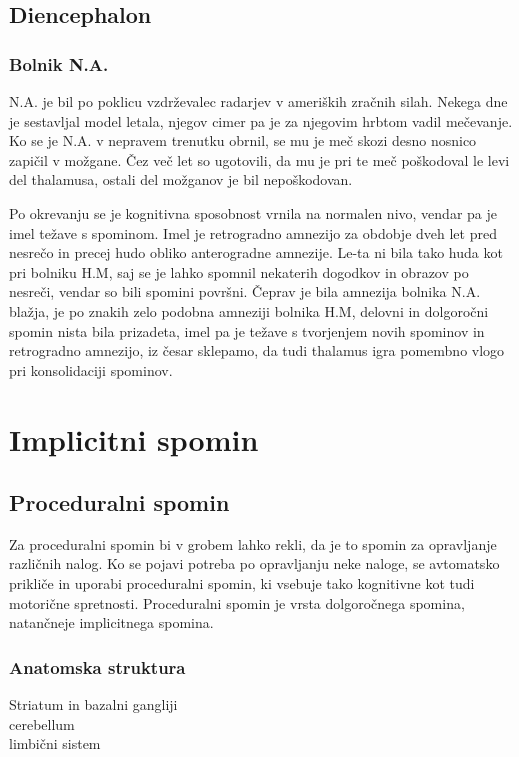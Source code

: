 \documentclass[10pt,a4paper]{article}
\begin{document}
\subsection{Diencephalon}
\subsubsection{Bolnik N.A.}
N.A. je bil po poklicu vzdrževalec radarjev v ameriških zračnih silah. Nekega dne je sestavljal model letala, njegov cimer pa je za njegovim hrbtom vadil mečevanje. Ko se je N.A. v nepravem trenutku obrnil, se mu je meč skozi desno nosnico zapičil v možgane. Čez več let so ugotovili, da mu je pri te meč poškodoval le levi del thalamusa, ostali del možganov je bil nepoškodovan.

Po okrevanju se je kognitivna sposobnost vrnila na normalen nivo, vendar pa je imel težave s spominom. Imel je retrogradno amnezijo za obdobje dveh let pred nesrečo in precej hudo obliko anterogradne amnezije. Le-ta ni bila tako huda kot pri bolniku H.M, saj se je lahko spomnil nekaterih dogodkov in obrazov po nesreči, vendar so bili spomini površni. Čeprav je bila amnezija bolnika N.A. blažja, je po znakih zelo podobna amneziji bolnika H.M, delovni in dolgoročni spomin nista bila prizadeta, imel pa je težave s tvorjenjem novih spominov in retrogradno amnezijo, iz česar sklepamo, da tudi thalamus igra pomembno vlogo pri konsolidaciji spominov.

\section{Implicitni spomin}
\subsection{Proceduralni spomin}
Za proceduralni spomin bi v grobem lahko rekli, da je to spomin za opravljanje različnih nalog. Ko se pojavi potreba po opravljanju neke naloge, se avtomatsko prikliče in uporabi proceduralni spomin, ki vsebuje tako kognitivne kot tudi motorične spretnosti. Proceduralni spomin je vrsta dolgoročnega spomina, natančneje implicitnega spomina.

\subsubsection{Anatomska struktura}
Striatum in bazalni gangliji\\
cerebellum\\
limbični sistem
\end{document}
